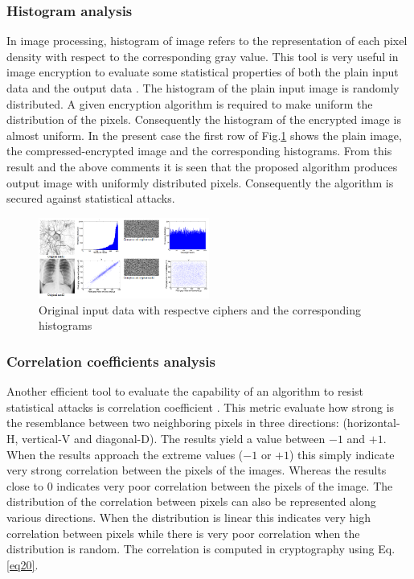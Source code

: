 \documentclass[journal]{IEEEtran/IEEEtran}
\begin{document}
\subsubsection{Histogram analysis}

In image processing, histogram of image refers to the representation of each pixel density with respect to the corresponding gray value. This tool is very useful in image encryption to evaluate some statistical properties of both the plain input data and the output data \cite{njitacke2021complex}. The histogram of the plain input image is randomly distributed. A given encryption algorithm is required to make uniform the distribution of the pixels. Consequently the histogram of the encrypted image is almost uniform. In the present case the first row of  Fig.\ref{fig7} shows the plain image, the compressed-encrypted image and the corresponding histograms. From this result and the above comments it is seen that the proposed algorithm produces output image with uniformly distributed pixels. Consequently the algorithm is secured against statistical attacks.


\begin{figure}[!t]
	\centering
	\includegraphics[width=0.5\textwidth]{fig7.png}
		\caption{Original input data with respectve ciphers and the corresponding histograms}
	\label{fig7}
\end{figure}

\subsubsection{Correlation coefficients analysis}

Another efficient tool to evaluate the capability of an algorithm to resist statistical attacks is correlation coefficient \cite{ding2020deepedn}. This metric evaluate how strong is the resemblance between two neighboring pixels in three directions: (horizontal-H, vertical-V and diagonal-D). The results yield a value between $-1$ and $+1$. When the results approach the extreme values ($-1$ or $+1$) this simply indicate very strong correlation between the pixels of the images. Whereas the results close to $0$ indicates very poor correlation between the pixels of the image. The distribution of the correlation between pixels can also be represented along various directions. When the distribution is linear this indicates very high correlation between pixels while there is very poor correlation when the distribution is random. The correlation is computed in cryptography using Eq.\ref{eq20}.
\end{document}
